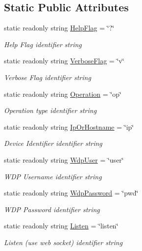 \subsection*{Static Public Attributes}
\begin{DoxyCompactItemize}
\item 
static readonly string \hyperlink{class_xbox_wdp_driver_1_1_parameter_helper_adc40a7e5980dfe95e09ebf4cb4f20e51}{Help\+Flag} = \char`\"{}?\char`\"{}
\begin{DoxyCompactList}\small\item\em Help Flag identifier string \end{DoxyCompactList}\item 
static readonly string \hyperlink{class_xbox_wdp_driver_1_1_parameter_helper_ab416a1b0e7eb1595ce658b44772a4a01}{Verbose\+Flag} = \char`\"{}v\char`\"{}
\begin{DoxyCompactList}\small\item\em Verbose Flag identifier string \end{DoxyCompactList}\item 
static readonly string \hyperlink{class_xbox_wdp_driver_1_1_parameter_helper_a3f7664000cb974494e187ee1a571e624}{Operation} = \char`\"{}op\char`\"{}
\begin{DoxyCompactList}\small\item\em Operation type identifier string \end{DoxyCompactList}\item 
static readonly string \hyperlink{class_xbox_wdp_driver_1_1_parameter_helper_af8fdfdb69d5e68410893d36d51d4cb98}{Ip\+Or\+Hostname} = \char`\"{}ip\char`\"{}
\begin{DoxyCompactList}\small\item\em Device Identifier identifier string \end{DoxyCompactList}\item 
static readonly string \hyperlink{class_xbox_wdp_driver_1_1_parameter_helper_ad561cf66a2e9f5179a3343f76df3010e}{Wdp\+User} = \char`\"{}user\char`\"{}
\begin{DoxyCompactList}\small\item\em W\+DP Username identifier string \end{DoxyCompactList}\item 
static readonly string \hyperlink{class_xbox_wdp_driver_1_1_parameter_helper_acea1cb42361f521ed5d644db783ef2c6}{Wdp\+Password} = \char`\"{}pwd\char`\"{}
\begin{DoxyCompactList}\small\item\em W\+DP Password identifier string \end{DoxyCompactList}\item 
static readonly string \hyperlink{class_xbox_wdp_driver_1_1_parameter_helper_a831c1ff817ac381e9dbd2802ea96ad81}{Listen} = \char`\"{}listen\char`\"{}
\begin{DoxyCompactList}\small\item\em Listen (use web socket) identifier string \end{DoxyCompactList}\end{DoxyCompactItemize}


